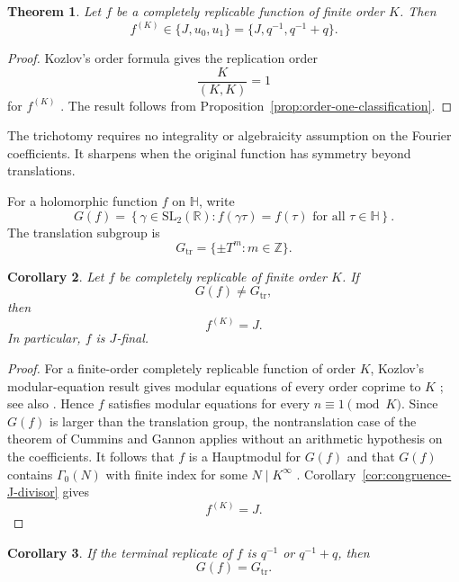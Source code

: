 \documentclass[12pt]{amsart}
\newtheorem{thm}{Theorem}[section]
\newtheorem{cor}[thm]{Corollary}
\theoremstyle{definition}
\theoremstyle{remark}
\numberwithin{equation}{section}
\newcommand{\Hh}{\mathbb H}
\newcommand{\Z}{\mathbb Z}
\begin{document}
\begin{thm}\label{thm:terminal-trichotomy}
Let $f$ be a completely replicable function of finite order $K$. Then
\begin{equation}\label{eq:terminal-three}
f^{(K)}\in\{J,u_0,u_1\}
=\{J,q^{-1},q^{-1}+q\}.
\end{equation}
\end{thm}

\begin{proof}
Kozlov's order formula gives the replication order
\[
\frac{K}{(K,K)}=1
\]
for $f^{(K)}$ \cite{kozlov}. The result follows from Proposition~\ref{prop:order-one-classification}.
\end{proof}

The trichotomy requires no integrality or algebraicity assumption on the Fourier coefficients. It sharpens when the original function has symmetry beyond translations.

For a holomorphic function $f$ on $\Hh$, write
\[
G(f)=
\left\{
\gamma\in\mathrm{SL}_2(\mathbb R):
f(\gamma\tau)=f(\tau)\text{ for all }\tau\in\Hh
\right\}.
\]
The translation subgroup is
\[
G_{\mathrm{tr}}=\{\pm T^m:m\in\Z\}.
\]

\begin{cor}\label{cor:nontranslation-J-final}
Let $f$ be completely replicable of finite order $K$. If
\[
G(f)\neq G_{\mathrm{tr}},
\]
then
\[
f^{(K)}=J.
\]
In particular, $f$ is $J$-final.
\end{cor}

\begin{proof}
For a finite-order completely replicable function of order $K$, Kozlov's modular-equation result gives modular equations of every order coprime to $K$ \cite{kozlov}; see also \cite[Section~8]{cummins-gannon}. Hence $f$ satisfies modular equations for every $n\equiv1\pmod K$. Since $G(f)$ is larger than the translation group, the nontranslation case of the theorem of Cummins and Gannon applies without an arithmetic hypothesis on the coefficients. It follows that $f$ is a Hauptmodul for $G(f)$ and that $G(f)$ contains $\Gamma_0(N)$ with finite index for some $N\mid K^\infty$ \cite[Theorem~1.3]{cummins-gannon}. Corollary~\ref{cor:congruence-J-divisor} gives
\[
f^{(K)}=J.
\]
\end{proof}

\begin{cor}\label{cor:terminal-translation}
If the terminal replicate of $f$ is $q^{-1}$ or $q^{-1}+q$, then
\[
G(f)=G_{\mathrm{tr}}.
\]
\end{cor}
\end{document}
